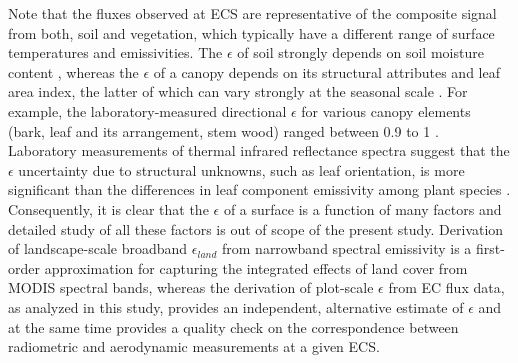 \documentclass[fleqn,10pt]{wlscirep}
\begin{document}
{{Note that the fluxes observed at ECS are representative of the composite signal from both, soil and vegetation, which typically have a different range of surface temperatures and emissivities\cite{jin2006improved}. The $\epsilon$ of soil strongly depends on soil moisture content \cite{mira2007influence}, whereas the $\epsilon$ of a canopy depends on its structural attributes and leaf area index, the latter of which can vary strongly at the seasonal scale \cite{chen2015determining}. For example, the laboratory-measured directional $\epsilon$ for various canopy elements (bark, leaf and its arrangement, stem wood) ranged between 0.9 to 1 \cite{vishnevetsky2019method}. Laboratory measurements of thermal infrared reflectance spectra suggest that the $\epsilon$ uncertainty due to structural unknowns, such as leaf orientation, is more significant than the differences in leaf component emissivity among plant species \cite{snyder1998classification}. Consequently, it is clear that the $\epsilon$ of a surface is a function of many factors and detailed study of all these factors is out of scope of the present study. Derivation of landscape-scale broadband $\epsilon_{land}$ from narrowband spectral emissivity is a first-order approximation for capturing the integrated effects of land cover from MODIS spectral bands\cite{jin2006improved}, whereas the derivation of plot-scale $\epsilon$ from EC flux data, as analyzed in this study, provides an independent, alternative estimate of $\epsilon$ and at the same time provides a quality check on the correspondence between radiometric and aerodynamic measurements at a given ECS.

}}
\end{document}
